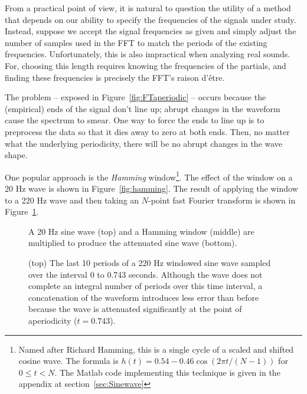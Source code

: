 From a practical point of view, it is natural to question the
utility of a method that depends on our ability to specify the
frequencies of the signals under study.
Instead, suppose we accept the signal frequencies as given and simply
adjust the number of samples used in the FFT to match the periods of
the existing frequencies.  Unfortunately, this is also impractical
when analyzing real sounds.  For, choosing this length
requires knowing the frequencies of the partials, and finding these
frequencies is precisely the FFT's raison d'\^{e}tre.

The problem -- exposed in Figure~\ref{fig:FTaperiodic} -- occurs because
the (empirical) ends of the signal don't line up; abrupt changes in
the waveform cause the spectrum to smear.  One way to force the ends
to line up is to preprocess the data so that it dies away to zero at
both ends.  Then, no matter what the underlying periodicity, there
will be no abrupt changes in the wave shape.

One popular approach is the \emph{Hamming} 
window\footnote{Named after Richard Hamming, this is a single cycle of
a scaled and shifted cosine wave.  The formula is $h(t) = 0.54 - 0.46
\cos(2\pi t/(N-1))$ for $0 \leq t < N$.  The Matlab code implementing
this technique is given in the appendix at section~\ref{sec:Sinewave}}.
The effect of the window on a 20 Hz wave is shown in
Figure~\ref{fig:hamming}.  The result of applying the window to a 220
Hz wave and then taking an $N$-point fast Fourier transform is
shown in Figure~\ref{fig:FThamming}. 
\begin{figure}
  \caption{{\small A 20 Hz sine wave (top) and a Hamming window (middle) are
  multiplied to produce the attenuated sine wave (bottom).}}
  \label{fig:hamming}
%
  \caption{{\small (top) The last 10 periods of a 220 Hz windowed sine wave
  sampled over the interval 0 to 0.743 seconds.  Although the wave does
  not complete an integral number of periods over this time interval, a
  concatenation of the  waveform introduces less error than before
  because the wave is attenuated significantly at the point of
  aperiodicity ($t=0.743$).}}
  \label{fig:FThamming}
\end{figure}

